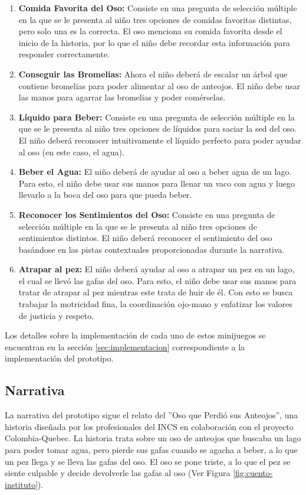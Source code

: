 \begin{enumerate}
  \item \textbf{Comida Favorita del Oso:} Consiste en una pregunta de selección múltiple en la que se le presenta al niño tres opciones de comidas favoritas distintas, pero solo una es la correcta. El oso menciona su comida favorita desde el inicio de la historia, por lo que el niño debe recordar esta información para responder correctamente.
  \item \textbf{Conseguir las Bromelias:} Ahora el niño deberá de escalar un árbol que contiene bromelias para poder alimentar al oso de anteojos. El niño debe usar las manos para agarrar las bromelias y poder comérselas.
  \item \textbf{Líquido para Beber:} Consiste en una pregunta de selección múltiple en la que se le presenta al niño tres opciones de líquidos para saciar la sed del oso. El niño deberá reconocer intuitivamente el líquido perfecto para poder ayudar al oso (en este caso, el agua).
  \item \textbf{Beber el Agua:} El niño deberá de ayudar al oso a beber agua de un lago. Para esto, el niño debe usar sus manos para llenar un vaco con agua y luego llevarlo a la boca del oso para que pueda beber.
  \item \textbf{Reconocer los Sentimientos del Oso:} Consiste en una pregunta de selección múltiple en la que se le presenta al niño tres opciones de sentimientos distintos. El niño deberá reconocer el sentimiento del oso basándose en las pistas contextuales proporcionadas durante la narrativa.
  \item \textbf{Atrapar al pez:} El niño deberá ayudar al oso a atrapar un pez en un lago, el cual se llevó las gafas del oso. Para esto, el niño debe usar sus manos para tratar de atrapar al pez mientras este trata de huir de él. Con esto se busca trabajar la motricidad fina, la coordinación ojo-mano y enfatizar los valores de justicia y respeto.
\end{enumerate}

Los detalles sobre la implementación de cada uno de estos minijuegos se encuentran en la sección \ref{sec:implementacion} correspondiente a la implementación del prototipo.

\subsection{Narrativa} \label{sec:narrativa}
La narrativa del prototipo sigue el relato del ''Oso que Perdió sus Anteojos'', una historia diseñada por los profesionales del INCS en colaboración con el proyecto Colombia-Quebec.
La historia trata sobre un oso de anteojos que buscaba un lago para poder tomar agua, pero pierde sus gafas cuando se agacha a beber, a lo que un pez llega y se lleva las gafas del oso.
El oso se pone triste, a lo que el pez se siente culpable y decide devolverle las gafas al oso (Ver Figura \ref{fig:cuento-instituto}).

